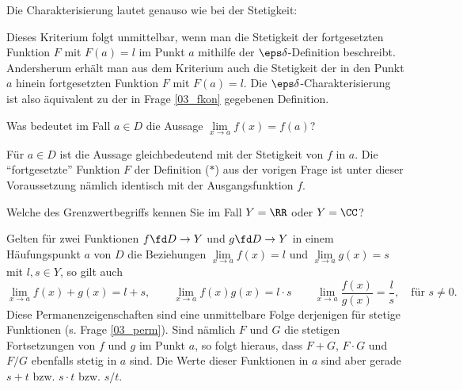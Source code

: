 \begin{antwort}
  Die Charakterisierung lautet genauso wie bei der Stetigkeit: 

  \medskip\noindent%

  \medskip\noindent%
  Dieses Kriterium folgt unmittelbar, wenn man die Stetigkeit 
  der fortgesetzten Funktion $F$ mit $F(a)=l$ im Punkt $a$ mithilfe 
  der $\eps\delta$-Definition beschreibt. Andersherum erhält man 
  aus dem Kriterium auch die Stetigkeit der in den 
  Punkt $a$ hinein fortgesetzten Funktion $F$ mit $F(a)=l$. 
  Die $\eps\delta$-Charakterisierung ist also äquivalent zu der in Frage 
  \ref{03_fkon} gegebenen Definition.
  \AntEnd
\end{antwort}


\begin{frage}\label{03_aind}
  Was bedeutet im Fall $a\in D$ die Aussage 
  $\lim\limits_{x\to a} f(x) = f(a)$?
\end{frage}

\begin{antwort}
  Für $a\in D$ ist die Aussage gleichbedeutend mit der Stetigkeit 
  von $f$ in $a$. Die "`fortgesetzte"' Funktion 
  $F$ der Definition ($\ast$) aus der vorigen Frage ist unter dieser 
  Voraussetzung nämlich identisch mit 
  der Ausgangsfunktion $f$.    
  \AntEnd
\end{antwort}

\begin{frage}\label{03_perf}
  Welche  des Grenzwertbegriffs 
  kennen Sie im Fall $Y=\RR$ oder $Y=\CC$?
\end{frage}

\begin{antwort}
  Gelten für zwei Funktionen $f\fd D\to Y$ und $g\fd D\to Y$ 
  in einem Häufungspunkt $a$ von $D$ die Beziehungen 
  $\lim\limits_{x\to a} f(x)= l$ und 
  $\lim\limits_{x\to a} g(x)=s$ mit $l,s\in Y$, so gilt auch
  \[
  \lim_{x\to a} f(x)+g(x)=l+s, \qquad 
  \lim_{x\to a} f(x)g(x)=l\cdot s \qquad 
  \lim_{x\to a}\frac{ f(x) }{ g(x)}=\frac{l}{s},\quad\text{für $s\not=0$}.
  \]   
  Diese Permanenzeigenschaften sind eine unmittelbare Folge derjenigen 
  für stetige Funktionen (s. Frage \ref{03_perm}). Sind nämlich $F$ 
  und $G$ die stetigen Fortsetzungen von $f$ und $g$ im Punkt $a$, so folgt 
  hieraus, dass $F+G$, $F\cdot G$ und $F/G$ ebenfalls stetig in $a$ sind. 
  Die Werte dieser Funktionen in $a$ sind aber gerade $s+t$ bzw. $s\cdot t$ 
  bzw. $s/t$.
  \AntEnd 
\end{antwort}


